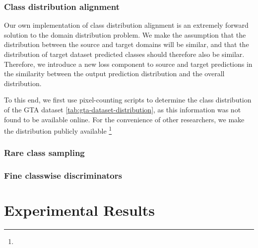 \documentclass[a4paper,12pt]{report}
\begin{document}
\subsubsection{Class distribution alignment}
Our own implementation of class distribution alignment is an extremely forward solution to the domain distribution problem. We make the assumption that the distribution between the source and target domains will be similar, and that the distribution of target dataset predicted classes should therefore also be similar. Therefore, we introduce a new loss component to source and target predictions in the similarity between the output prediction distribution and the overall distribution.

To this end, we first use pixel-counting scripts to determine the class distribution of the GTA dataset \ref{tab:gta-dataset-distribution}, as this information was not found to be available online. For the convenience of other researchers, we make the distribution publicly available \footnote{}
\subsubsection{Rare class sampling}
\subsubsection{Fine classwise discriminators}





\section{Experimental Results}
% 
\end{document}
